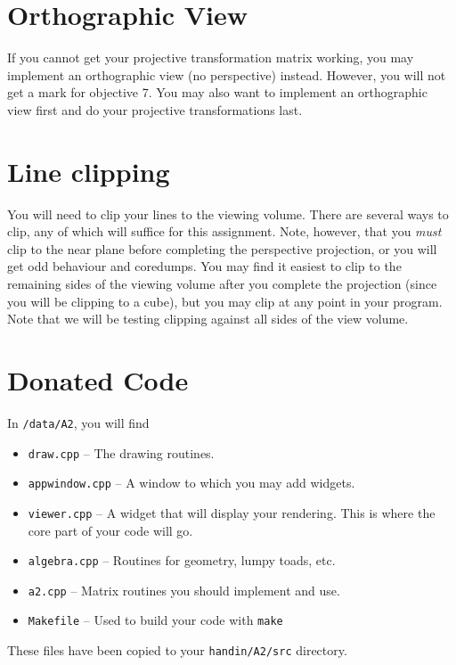 \section{Orthographic View}
If you cannot get your projective transformation matrix working,
you may implement an orthographic view (no perspective) instead.
However, you will not get a mark for objective 7.  You may also 
want to implement an orthographic view first and do your projective
transformations last.

\section{Line clipping}
You will need to clip your lines to the viewing volume.  There are
several ways to clip, any of which will suffice for this assignment.
Note, however, that you \emph{must} clip to the near plane before completing
the perspective projection, or you will get odd behaviour and coredumps.
You may find it easiest to clip to the remaining sides of the viewing
volume after you complete the projection (since you will be clipping to
a cube), but you may clip at any point in your program.
Note that we will be testing clipping against all sides of the view
volume.

\section{Donated Code}
In {\tt \CourseData/data/A2}, you will find
\begin{itemize}
        \item {\tt draw.cpp} -- The drawing routines.
        \item {\tt appwindow.cpp} -- A window to which you may add
          widgets.
        \item {\tt viewer.cpp} -- A widget that will display your
          rendering. This is where the core part of your code will go.
	\item {\tt algebra.cpp} -- Routines for geometry, lumpy toads,
          etc.
	\item {\tt a2.cpp} -- Matrix routines you should implement and use.
        \item {\tt Makefile} -- Used to build your code with \texttt{make} 
\end{itemize}
These files have been copied to your \texttt{handin/A2/src} directory.


